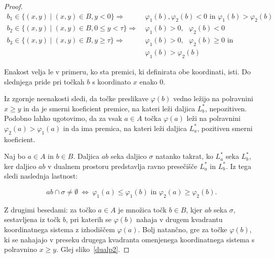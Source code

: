 \documentclass[a4paper, 12pt]{book}
\begin{document}
\begin{proof}
\begin{align*}
    b_1 \in \{ (x,y) \mid (x,y) \in B, y < 0 \} \Rightarrow &~ \varphi_1(b),\varphi_2(b) < 0 \text{ in } \varphi_1(b) > \varphi_2(b) \\
b_2 \in \{ (x,y) \mid (x,y) \in B, 0 \le y < \tau \} \Rightarrow &~ \varphi_1(b) > 0, \text{ } \varphi_2(b) < 0 \\
    b_3 \in \{ (x,y) \mid (x,y) \in B, y \ge \tau \} \Rightarrow &~ \varphi_1(b) > 0, \text{ } \varphi_2(b) \ge 0 \text{ in }\\ 
    &~\varphi_1(b) > \varphi_2(b)
\end{align*}

Enakost velja le v primeru, ko sta premici, ki definirata obe koordinati, isti. Do slednjega pride pri točkah $b$ s koordinato $x$ enako $0$. 

Iz zgornje neenakosti sledi, da točke preslikave $\varphi(b)$ vedno ležijo na polravnini $x \geq y$ in da je smerni koeficient premice, na kateri leži daljica $L^*_b$, nepozitiven. Podobno lahko ugotovimo, da za vsak $a \in A$ točka $\varphi(a)$ leži na polravnini $\varphi_2(a) > \varphi_1(a)$ in da ima premica, na kateri leži daljica $L^*_a$, pozitiven smerni koeficient.

Naj bo $a \in A$ in $b \in B$. Daljica $ab$ seka daljico $\sigma$ natanko takrat, ko $L^*_a$ seka $L^*_b$, ker daljico $ab$ v dualnem prostoru predstavlja ravno presečišče $L^*_a$ in $L^*_b$. Iz tega sledi naslednja lastnost:

	\[
		ab \cap \sigma \neq \emptyset ~\Longleftrightarrow ~ 
		\varphi_1(a)\le \varphi_1(b) \text{ in } \varphi_2(a)\ge \varphi_2(b).
	\]	
	
Z drugimi besedami: za točko $a \in A$ je množica točk $b \in B$, kjer $ab$ seka $\sigma$, sestavljena iz točk $b$, pri katerih se $\varphi(b)$ nahaja v drugem kvadrantu koordinatnega sistema z izhodiščem $\varphi(a)$. Bolj natančno, gre za točke $\varphi(b)$, ki se nahajajo v preseku drugega kvadranta omenjenega koordinatnega sistema s polravnino $x \geq y$. Glej sliko~\ref{dualp2}.


\end{proof}
\end{document}
